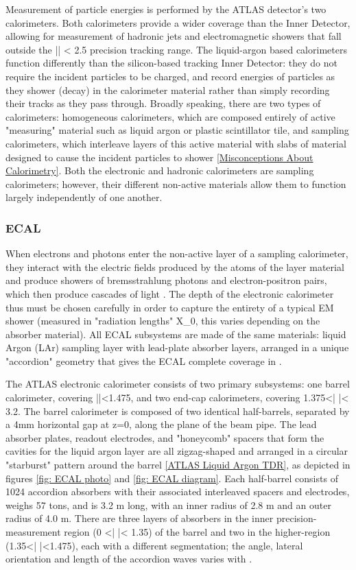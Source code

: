 Measurement of particle energies is performed by the ATLAS detector's two calorimeters. Both calorimeters provide a wider \eta coverage than the Inner Detector, allowing for measurement of hadronic jets and electromagnetic showers that fall outside the |\eta| < 2.5 precision tracking range. The liquid-argon based calorimeters function differently than the silicon-based tracking Inner Detector: they do not require the incident particles to be charged, and record energies of particles as they shower (decay) in the calorimeter material rather than simply recording their tracks as they pass through. Broadly speaking, there are two types of calorimeters: homogeneous calorimeters, which are composed entirely of active "measuring" material such as liquid argon or plastic scintillator tile, and sampling calorimeters, which interleave layers of this active material with slabs of material designed to cause the incident particles to shower \ref{Misconceptions About Calorimetry}. Both the electronic and hadronic calorimeters are sampling calorimeters; however, their different non-active materials allow them to function largely independently of one another.

\subsubsection{ECAL} \label{sec:ECAL} 

When electrons and photons enter the non-active layer of a sampling calorimeter, they interact with the electric fields produced by the atoms of the layer material and produce showers of bremsstrahlung photons and electron-positron pairs, which then produce cascades of light . The depth of the electronic calorimeter thus must be chosen carefully in order to capture the entirety of a typical EM shower (measured in "radiation lengths" X_0, this varies depending on the absorber material). All ECAL subsystems are made of the same materials: liquid Argon (LAr) sampling layer with lead-plate absorber layers, arranged in a unique "accordion" geometry that gives the ECAL complete coverage in \phi .

The ATLAS electronic calorimeter consists of two primary subsystems: one barrel calorimeter, covering |\eta |<1.475, and two end-cap calorimeters, covering 1.375<| \eta |< 3.2. The barrel calorimeter is composed of two identical half-barrels, separated by a 4mm horizontal gap at z=0, along the plane of the beam pipe. The lead absorber plates, readout electrodes, and "honeycomb" spacers that form the cavities for the liquid argon layer are all zigzag-shaped and arranged in a circular "starburst" pattern around the barrel \ref{ATLAS Liquid Argon TDR}, as depicted in figures \ref{fig: ECAL photo} and \ref{fig: ECAL diagram}. Each half-barrel consists of 1024 accordion absorbers with their associated interleaved spacers and electrodes, weighs 57 tons, and is 3.2 m long, with an inner radius of 2.8 m and an outer radius of 4.0 m. There are three layers of absorbers in the inner precision-measurement region (0 <| \eta |< 1.35) of the barrel and two in the higher-\eta region (1.35<| \eta |<1.475), each with a different segmentation; the angle, lateral orientation and length of the accordion waves varies with \eta.

